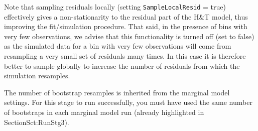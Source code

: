 Note that sampling residuals locally (setting \verb|SampleLocalResid| = true) effectively gives a non-stationarity to the residual part of the H\&T model, thus improving the fit/simulation procedure. That said, in the presence of bins with very few observations, we advise that this functionality is turned off (set to false) as the simulated data for a bin with very few observations will come from resampling a very small set of residuals many times. In this case it is therefore better to sample globally to increase the number of residuals from which the simulation resamples. 

The number of bootstrap resamples is inherited from the marginal model settings. For this stage to run successfully, you must have used the same number of bootstraps in each marginal model run (already highlighted in Section{Sct:RunStg3}). 

